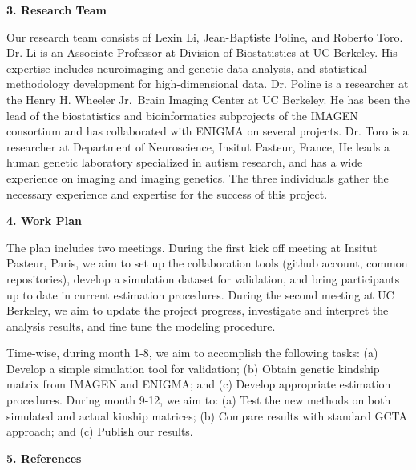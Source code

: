 \documentclass[12pt]{article}
\begin{document}
\noindent
{\large \textbf{3. Research Team}}
\medskip

\noindent
Our research team consists of Lexin Li, Jean-Baptiste Poline, and Roberto Toro. Dr. Li is an Associate Professor at Division of Biostatistics at UC Berkeley. His expertise includes neuroimaging and genetic data analysis, and statistical methodology development for high-dimensional  data. Dr. Poline is a researcher at the Henry H. Wheeler Jr.\ Brain Imaging Center at UC Berkeley. He has been the lead of the biostatistics and bioinformatics subprojects of the IMAGEN consortium and has collaborated with ENIGMA on several projects. Dr. Toro is a researcher at Department of Neuroscience, Insitut Pasteur, France, He leads a human genetic laboratory specialized in autism research, and has a wide experience on imaging and imaging genetics. The three individuals gather the necessary experience and expertise for the success of this project.
\bigskip



\noindent
{\large \textbf{4. Work Plan}}
\medskip

\noindent
The plan includes two meetings. During the first kick off meeting at Insitut Pasteur, Paris, we aim to set up the collaboration tools (github account, common repositories), develop a simulation dataset for validation, and bring participants up to date in current estimation procedures. During the second meeting at UC Berkeley, we aim to update the project progress, investigate and interpret the analysis results, and fine tune the modeling procedure. 

Time-wise, during month 1-8, we aim to accomplish the following tasks: (a) Develop a simple simulation tool for validation; (b) Obtain genetic kindship matrix from IMAGEN and ENIGMA; and (c) Develop appropriate estimation procedures. During month 9-12, we aim to: (a) Test the new methods on both simulated and actual kinship matrices; (b) Compare results with standard GCTA approach; and (c) Publish our results. 
\bigskip



\noindent
{\large \textbf{5. References}}
\medskip
\end{document}
